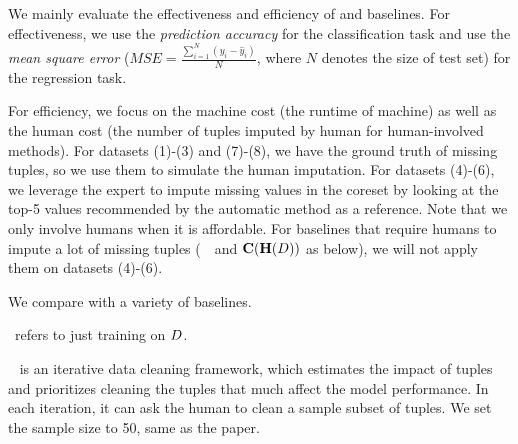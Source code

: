 We mainly evaluate the effectiveness and efficiency of \ours and  baselines. For effectiveness, we use the {\it prediction accuracy} for the classification task and use the {\it mean square error} ($MSE = \frac{\sum_{i=1}^N(y_i-\hat{y}_i)}{N}$, where $N$ denotes the size of test set) for the regression task. 

For efficiency, we focus on the machine cost (\ie the runtime of machine) as well as the human cost (the number of tuples imputed by human for human-involved methods). For datasets (1)-(3) and (7)-(8), we have the ground truth of missing tuples, so we use them to simulate the human imputation. For datasets (4)-(6), we leverage the expert to impute missing values in the coreset by looking at the top-5 values recommended by the automatic method as a reference. Note that we only involve humans when it is affordable. For baselines that require humans to impute a lot of missing tuples (\ie~\truth~and $\mathbf{C}(\mathbf{H}(D))$ as below), we will not apply them on datasets (4)-(6).

 We compare \ours with a variety of baselines.








~refers to just training on $D$.

~\cite{DBLP:journals/pvldb/KrishnanWWFG16} is an iterative data cleaning framework, which estimates the impact of tuples  and prioritizes cleaning the tuples that much affect the model performance. In each iteration, it can ask the human to clean a sample subset of tuples. We set the sample size to 50, same as the paper. 

